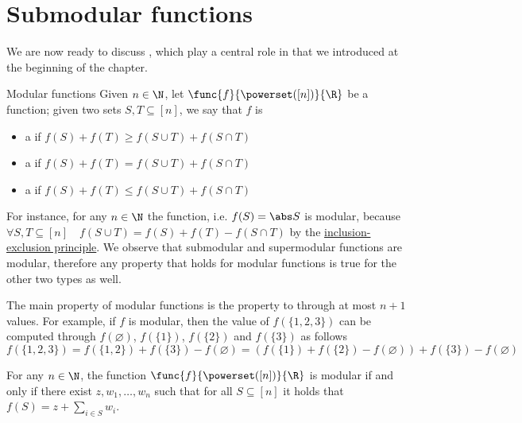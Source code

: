 \documentclass[a4paper, 12pt]{report}
\begin{document}
    \section{Submodular functions}

    We are now ready to discuss , which play a central role in  that we introduced at the beginning of the chapter.

    \begin{frameddefn}{Modular functions}
        Given $n \in \N$, let $\func{f}{\powerset([n])}{\R}$ be a function; given two sets $S, T \subseteq [n]$, we say that $f$ is

        \begin{itemize}
            \item a  if $f(S) + f(T) \ge f(S \cup T) + f(S \cap T)$
            \item a  if $f(S) + f(T) = f(S \cup T) + f(S \cap T)$
            \item a  if $f(S) + f(T) \le f(S \cup T) + f(S \cap T)$
        \end{itemize}
    \end{frameddefn}

    For instance, for any $n \in \N$ the  function, i.e. $f(S) = \abs S$ is modular, because $\forall S, T \subseteq [n] \quad f(S \cup T) = f(S) + f(T) - f(S \cap T)$ by the \href{https://en.wikipedia.org/wiki/Inclusion%E2%80%93exclusion_principle}{inclusion-exclusion principle}. We observe that submodular and supermodular functions are modular, therefore any property that holds for modular functions is true for the other two types as well.
    
    The main property of modular functions is the property to  through at most $n + 1$ values. For example, if $f$ is modular, then the value of $f(\{1, 2, 3\})$ can be computed through $f(\varnothing)$, $f(\{1\})$, $f(\{2\})$ and $f(\{3\})$ as follows $$f(\{1, 2, 3\}) = f(\{1, 2\}) + f(\{3\})- f(\varnothing) = (f(\{1\}) + f(\{2\}) - f(\varnothing)) + f(\{3\}) - f(\varnothing)$$

    \begin{framedprop}{}
        For any $n \in \N$, the function $\func{f}{\powerset([n])}{\R}$ is modular if and only if there exist $z, w_1, \ldots, w_n$ such that for all $S \subseteq [n]$ it holds that $f(S) = z + \sum_{i \in S}{w_i}$.
    \end{framedprop}
\end{document}
